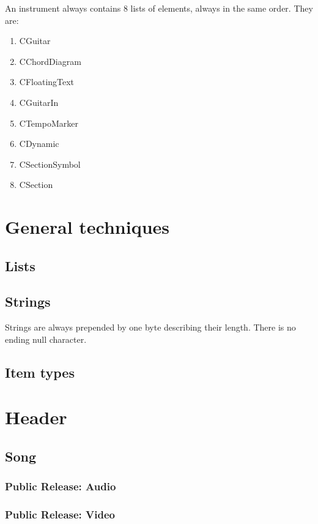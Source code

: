 \documentclass[a4paper]{article}
\begin{document}
An instrument always contains 8 lists of elements, always in the same order.
They are:

\begin{enumerate}
\item CGuitar
\item CChordDiagram
\item CFloatingText
\item CGuitarIn
\item CTempoMarker
\item CDynamic
\item CSectionSymbol
\item CSection
\end{enumerate}

\section{General techniques}

\subsection{Lists}

\subsection{Strings}

Strings are always prepended by one byte describing their length. There is 
no ending null character.

\subsection{Item types}

\section{Header}

\subsection{Song}

\subsubsection{Public Release: Audio}
\subsubsection{Public Release: Video}
\end{document}

